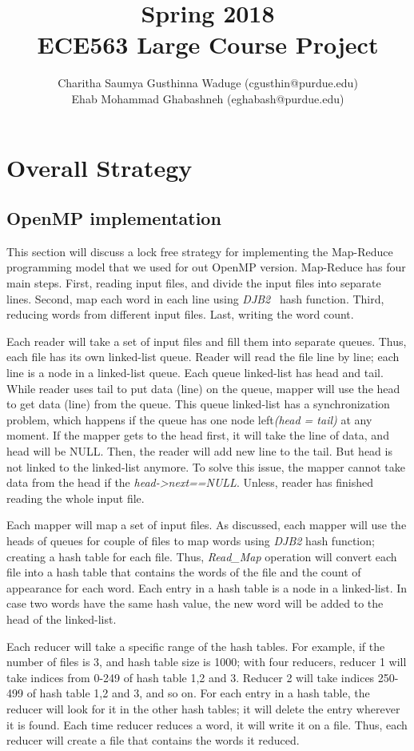 \documentclass[12pt]{article}
\title{Spring 2018\\  ECE563 Large Course Project}
\author{Charitha Saumya Gusthinna Waduge (cgusthin@purdue.edu) \\ Ehab Mohammad Ghabashneh (eghabash@purdue.edu)}
\begin{document}
\maketitle
\section{Overall Strategy}
\subsection{OpenMP implementation}
\label{omp-impl}
This section will discuss a lock free strategy for implementing the Map-Reduce programming model that we used for out OpenMP version. Map-Reduce has four main steps. First, reading input files, and divide the input files into separate lines. Second, map each word in each line using {\em DJB2}~\cite{djb2} hash function. Third, reducing words from different input files. Last, writing the word count. 

Each reader will take a set of input files and fill them into separate queues. Thus, each file has its own linked-list queue. Reader will read the file line by line; each line is a node in a linked-list queue. Each queue linked-list has head and tail. While reader uses tail to put data (line) on the queue, mapper will use the head to get data (line) from the queue. This queue linked-list has a synchronization problem, which happens if the queue has one node left{\em (head = tail)} at any moment. If the mapper gets to the head first, it will take the line of data, and head will be NULL. Then, the reader will add new line to the tail. But head is not linked to the linked-list anymore. To solve this issue, the mapper cannot take data from the head if the {\em head->next==NULL}. Unless, reader has finished reading the whole input file. 

Each mapper will map a set of input files. As discussed, each mapper will use the heads of queues for couple of files to map words using {\em DJB2} hash function; creating a hash table for each file. Thus, {\em Read\_Map} operation will convert each file into a hash table that contains the words of the file and the count of appearance for each word. Each entry in a hash table is a node in a linked-list. In case two words have the same hash value, the new word will be added to the head of the linked-list.

Each reducer will take a specific range of the hash tables. For example, if the number of files is 3, and hash table size is 1000; with four reducers, reducer 1 will take indices from 0-249 of hash table 1,2 and 3. Reducer 2 will take indices 250-499 of hash table 1,2 and 3, and so on. For each entry in a hash table, the reducer will look for it in the other hash tables; it will delete the entry wherever it is found. Each time reducer reduces a word, it will write it on a file. Thus, each reducer will create a file that contains the words it reduced.
\end{document}
